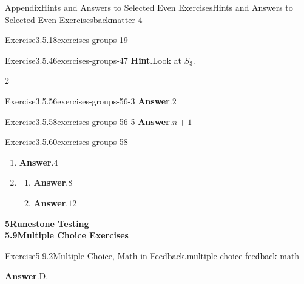 \documentclass[oneside,10pt,]{book}
\newcommand{\blocktitlefont}{\relax}
\numberwithin{equation}{section}
\begin{document}
\begin{solutions-chapter}{Appendix}{Hints and Answers to Selected Even Exercises}{}{Hints and Answers to Selected Even Exercises}{}{}{backmatter-4}
\begin{divisionsolution}{Exercise}{3.5.18}{}{exercises-groups-19}
\end{divisionsolution}%
\begin{divisionsolution}{Exercise}{3.5.46}{}{exercises-groups-47}%
\noindent\textbf{\blocktitlefont Hint}.\hypertarget{exercises-groups-47-2-back}{}\quad{}Look at \(S_3\).%
\end{divisionsolution}%
\begin{exercisegroupcol}{2}
\begin{divisionsolutionegcol}{Exercise}{3.5.56}{}{exercises-groups-56-3}%
\noindent\textbf{\blocktitlefont Answer}.\hypertarget{exercises-groups-56-3-2-back}{}\quad{}\(2\)%
\end{divisionsolutionegcol}%
\begin{divisionsolutionegcol}{Exercise}{3.5.58}{}{exercises-groups-56-5}%
\noindent\textbf{\blocktitlefont Answer}.\hypertarget{exercises-groups-56-5-2-back}{}\quad{}\(n+1\)%
\end{divisionsolutionegcol}%
\end{exercisegroupcol}
\par\medskip\noindent
\begin{divisionsolution}{Exercise}{3.5.60}{}{exercises-groups-58}%
\begin{enumerate}[font=\bfseries,label=(\alph*),ref=\alph*]%
\item[(a)]\noindent\textbf{\blocktitlefont Answer}.\hypertarget{exercises-groups-58-2-2-back}{}\quad{}\(4\)%
\item[(b)]\begin{enumerate}[font=\bfseries,label=(\roman*),ref=\theenumi.\roman*]%
\item[(i)]\noindent\textbf{\blocktitlefont Answer}.\hypertarget{exercises-groups-58-3-2-2-back}{}\quad{}\(8\)%
\item[(ii)]\noindent\textbf{\blocktitlefont Answer}.\hypertarget{exercises-groups-58-3-3-2-back}{}\quad{}\(12\)%
\end{enumerate}%
\end{enumerate}%
\end{divisionsolution}%
\par\medskip
\noindent\textbf{\Large{}5\space\textperiodcentered\space{}Runestone Testing\\
5.9\space\textperiodcentered\space{}Multiple Choice Exercises}
\begin{divisionsolution}{Exercise}{5.9.2}{Multiple-Choice, Math in Feedback.}{multiple-choice-feedback-math}%
\par\smallskip%
\noindent\textbf{\blocktitlefont Answer}.\hypertarget{multiple-choice-feedback-math-3-back}{}\quad{}D.%

\end{divisionsolution}
\end{solutions-chapter}
\end{document}
